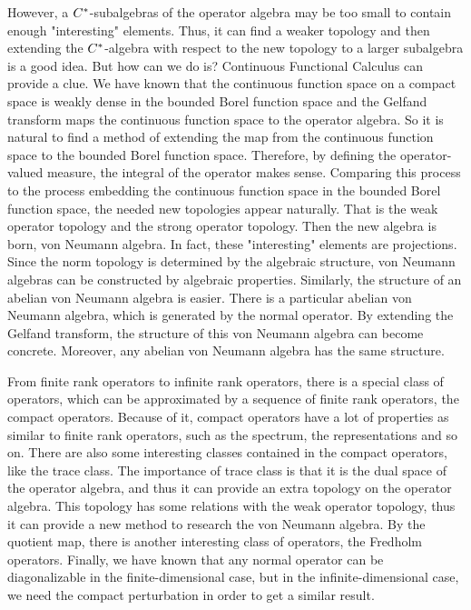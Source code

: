 However, a $C^{*}$-subalgebras of the operator algebra may be too small to contain enough "interesting" elements. Thus, it can find a weaker topology and then extending the $C^{*}$-algebra with respect to the new topology to a larger subalgebra is a good idea. But how can we do is? Continuous Functional Calculus can provide a clue. We have known that the continuous function space on a compact space is weakly dense in the bounded Borel function space and the Gelfand transform maps the continuous function space to the operator algebra. So it is natural to find a method of extending the map from the continuous function space to the bounded Borel function space. Therefore, by defining the operator-valued measure, the integral of the operator makes sense. Comparing this process to the process embedding the continuous function space in the bounded Borel function space, the needed new topologies appear naturally. That is the weak operator topology and the strong operator topology. Then the new algebra is born, von Neumann algebra. In fact, these "interesting" elements are projections. Since the norm topology is determined by the algebraic structure,  von Neumann algebras can be constructed by algebraic properties. Similarly, the structure of an abelian von Neumann algebra is easier. There is a particular abelian von Neumann algebra, which is generated by the normal operator. By extending the Gelfand transform, the structure of this von Neumann algebra can become concrete. Moreover, any abelian von Neumann algebra has the same structure.

From finite rank operators to infinite rank operators, there is a special class of operators, which can be approximated by a sequence of finite rank operators, the compact operators. Because of it, compact operators have a lot of properties as similar to finite rank operators, such as the spectrum, the representations and so on. There are also some interesting classes contained in the compact operators, like the trace class. The importance of trace class is that it is the dual space of the operator algebra, and thus it can provide an extra topology on the operator algebra. This topology has some relations with the weak operator topology, thus it can provide a new method to research the von Neumann algebra. By the quotient map, there is another interesting class of operators, the Fredholm operators. Finally, we have known that any normal operator can be diagonalizable in the finite-dimensional case, but in the infinite-dimensional case, we need the compact perturbation in order to get a similar result. 

